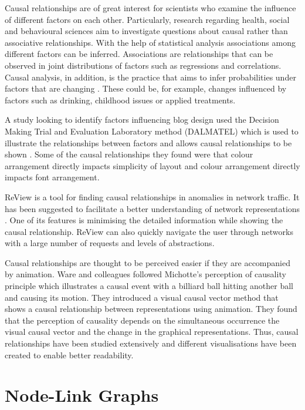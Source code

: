 \documentclass{l4proj}
\begin{document}
Causal relationships are of great interest for scientists who examine the influence of different factors on each other. Particularly, research regarding health, social and behavioural sciences aim to investigate questions about causal rather than associative relationships. With the help of statistical analysis associations among different factors can be inferred. Associations are relationships that can be observed in joint distributions of factors such as regressions and correlations. Causal analysis, in addition, is the practice that aims to infer probabilities under factors that are changing \cite{pearl2010introduction}. These could be, for example, changes influenced by factors such as drinking, childhood issues or applied treatments. 

A study looking to identify factors influencing blog design used the Decision Making Trial and Evaluation Laboratory method (DALMATEL) which is used to illustrate the relationships between factors and allows causal relationships to be shown \cite{hsu2012evaluation}. Some of the causal relationships they found were that colour arrangement directly impacts simplicity of layout and colour arrangement directly impacts font arrangement. 

ReView is a tool for finding causal relationships in anomalies in network traffic. It has been suggested to facilitate a better understanding of network representations \cite{Zhang:2015:VTC:2713579.2713583}. One of its features is minimising the detailed information while showing the causal relationship. ReView can also quickly navigate the user through networks with a large number of requests and levels of abstractions.

Causal relationships are thought to be perceived easier if they are accompanied by animation. Ware and colleagues \cite{ware1999visualizing} followed Michotte's perception of causality principle which illustrates a causal event with a billiard ball hitting another ball and causing its motion. They introduced a visual causal vector method that shows a causal relationship between representations using animation. They found that the perception of causality depends on the simultaneous occurrence the visual causal vector and the change in the graphical representations. Thus, causal relationships have been studied extensively and different visualisations have been created to enable better readability.

\section{Node-Link Graphs}
\end{document}
